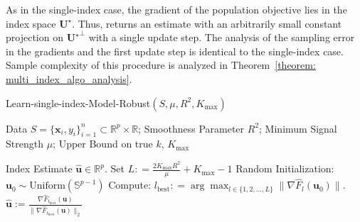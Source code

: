 \documentclass[final,12pt]{colt2018} %
\newcommand{\R}{\mathbb{R}}
\newcommand{\unitsphere}[1]{\mathbb{S}^{#1}}
\renewcommand\v[1]{{\ensuremath{\boldsymbol{#1}}}}
\begin{document}
As in the single-index case, the gradient of the population objective lies in the index space $\mathcal{\v U^\star}$. Thus,  returns an estimate with an arbitrarily small constant projection on ${\mathcal{\v U}^\star}^\perp$ with a single update step. The analysis of the sampling error in the gradients and the first update step is identical to the single-index case. Sample complexity of this procedure is analyzed in Theorem~\ref{theorem: multi_index_algo_analysis}.

\begin{algorithm}[t]
  \renewcommand\algorithmicrequire{\textbf{input}}
  \renewcommand\algorithmicensure{\textbf{output}}
  \caption{\textsf{Learn-single-index-Model-Robust$(S,\mu,R^2,K_{\text{max}})$}}
  \label{algorithm:multindex}
  \begin{algorithmic}[1]
    \REQUIRE
    Data $S=\{\v x_i, y_i\}_{i=1}^n \subset \R^p \times \R$;
    Smoothness Parameter $R^2$; 
    Minimum Signal Strength $\mu$; 
    Upper Bound on true $k$, $K_{\text{max}}$

    \renewcommand\algorithmicrequire{\textbf{assume}}
    
    \ENSURE
    Index Estimate $\hat{\v u} \in \R^p$.
    \STATE Set $L: = \frac{2K_{\text{max}} R^2}{\mu} + K_\text{max} - 1$
    \STATE Random Initialization: $\v u_0 \sim \text{Uniform}(\unitsphere{p-1})$
    \STATE Compute: $l_{\text{best}}: = \arg\max_{l\in \{1,2, \dotsc, L\}} \| \nabla \hat{F}_l(\v u_0) \|$.
    \RETURN  $\hat{\v u} := \frac{\nabla \hat{F}_{l_\text{best}}(\v u)}{\|\nabla \hat{F}_{l_\text{best}}(\v u) \|_2}$
  \end{algorithmic}
\end{algorithm}
\end{document}
